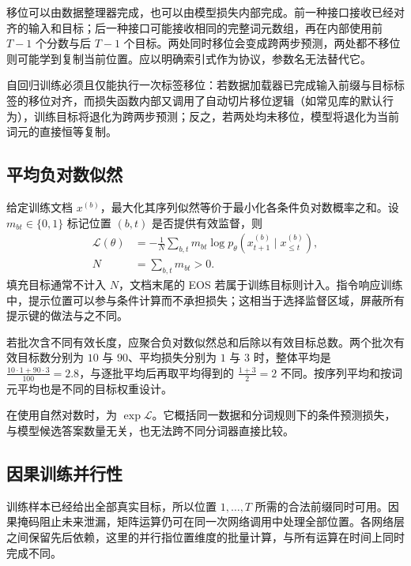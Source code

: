 \documentclass[../textbook.tex]{subfiles}
\begin{document}
移位可以由数据整理器完成，也可以由模型损失内部完成。前一种接口接收已经对齐的输入和目标；后一种接口可能接收相同的完整词元数组，再在内部使用前 $T-1$ 个分数与后 $T-1$ 个目标。两处同时移位会变成跨两步预测，两处都不移位则可能学到复制当前位置。应以明确索引式作为协议，参数名无法替代它。

\begin{warning}[自回归标签移位的双重移位陷阱]
自回归训练必须且仅能执行一次标签移位：若数据加载器已完成输入前缀与目标标签的移位对齐，而损失函数内部又调用了自动切片移位逻辑（如常见库的默认行为），训练目标将退化为跨两步预测；反之，若两处均未移位，模型将退化为当前词元的直接恒等复制。
\end{warning}

\subsection{平均负对数似然}
给定训练文档 $x^{(b)}$，最大化其序列似然等价于最小化各条件负对数概率之和。设 $m_{bt}\in\{0,1\}$ 标记位置 $(b,t)$ 是否提供有效监督，则
\begin{equation}\label{eq:ar-loss}
 \begin{aligned}
  \mathcal L(\theta)&=-\frac1N\sum_{b,t}m_{bt}
  \log p_\theta(x^{(b)}_{t+1}\mid x^{(b)}_{\leq t}),\\
  N&=\sum_{b,t}m_{bt}>0.
 \end{aligned}
\end{equation}
填充目标通常不计入 $N$，文档末尾的 EOS 若属于训练目标则计入。指令响应训练中，提示位置可以参与条件计算而不承担损失；这相当于选择监督区域，屏蔽所有提示键的做法与之不同。

若批次含不同有效长度，应聚合负对数似然总和后除以有效目标总数。两个批次有效目标数分别为 $10$ 与 $90$、平均损失分别为 $1$ 与 $3$ 时，整体平均是 $\frac{10\cdot1+90\cdot3}{100}=2.8$，与逐批平均后再取平均得到的 $\frac{1+3}{2}=2$ 不同。按序列平均和按词元平均也是不同的目标权重设计。

在使用自然对数时，为 $\exp\mathcal L$。它概括同一数据和分词规则下的条件预测损失，与模型候选答案数量无关，也无法跨不同分词器直接比较。

\subsection{因果训练并行性}
训练样本已经给出全部真实目标，所以位置 $1,\ldots,T$ 所需的合法前缀同时可用。因果掩码阻止未来泄漏，矩阵运算仍可在同一次网络调用中处理全部位置。各网络层之间保留先后依赖，这里的并行指位置维度的批量计算，与所有运算在时间上同时完成不同。
\end{document}
